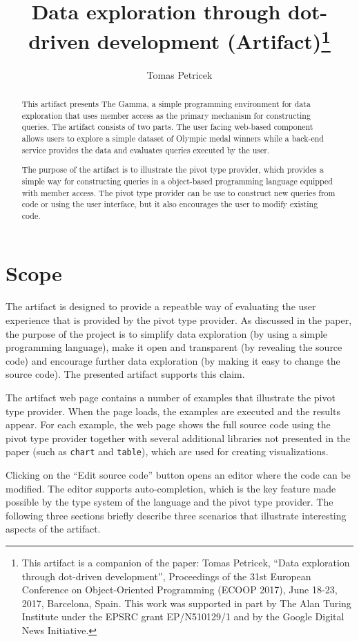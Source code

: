 \documentclass[a4paper,UKenglish]{darts}
\title{Data exploration through dot-driven development (Artifact)\footnote{This artifact is a companion of the paper:  Tomas Petricek, ``Data exploration through dot-driven development'', Proceedings of the 31st European Conference on Object-Oriented Programming (ECOOP 2017), June 18-23, 2017, Barcelona, Spain.  This work was supported in part by The Alan Turing Institute under the EPSRC grant EP/N510129/1 and by the Google Digital News Initiative.}}
\author[1]{Tomas Petricek}
\affil[1]{The Alan Turing Institute, London, UK\\
 and Microsoft Research, Cambridge, UK\\
  \texttt{tomas@tomasp.net}}
\newenvironment{scope}{\section{Scope}}{}
\begin{document}
\maketitle

\begin{abstract}
This artifact presents The Gamma, a simple programming environment for data exploration
that uses member access as the primary mechanism for constructing queries. The artifact 
consists of two parts. The user facing web-based component allows users to explore a simple
dataset of Olympic medal winners while a back-end service provides the data and evaluates
queries executed by the user.

The purpose of the artifact is to illustrate the pivot type provider, which provides a simple
way for constructing queries in a object-based programming language equipped with member 
access. The pivot type provider can be use to
construct new queries from code or using the user interface, but it also encourages the user
to modify existing code.  
\end{abstract}

\begin{scope}
The artifact is designed to provide a repeatble way of evaluating the user experience that
is provided by the pivot type provider. As discussed in the paper, the purpose of the project
is to simplify data exploration (by using a simple programming language), make it open and 
transparent (by revealing the source code) and encourage further data exploration (by making
it easy to change the source code). The presented artifact supports this claim.
  
The artifact web page contains a number of examples that illustrate the pivot type provider. When the
page loads, the examples are executed and the results appear.
For each example, the web page shows the full source code using the pivot type provider together
with several additional libraries not presented in the paper (such as \texttt{chart} and \texttt{table}),
which are used for creating visualizations.

Clicking on the ``Edit source code'' button opens an editor where the code can be modified. The
editor supports auto-completion, which is the key feature made possible by the type system of the
language and the pivot type provider. The following three sections briefly describe three scenarios
that illustrate interesting aspects of the artifact.
\end{scope}
\end{document}
